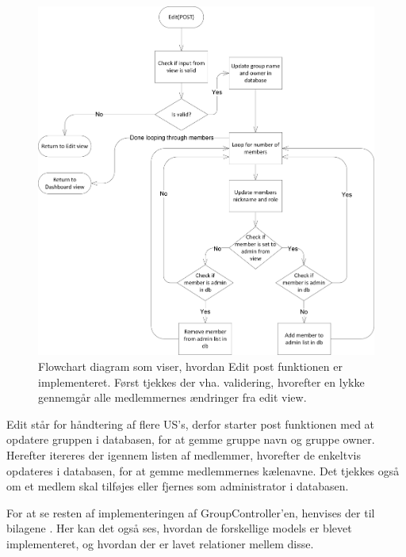 \begin{figure}[H]
  \includegraphics[width=\linewidth]{01_Billeder/10_Design_og_implementering/Group/Imp_Group_Edit_Post2.png}
  \centering
  \caption{Flowchart diagram som viser, hvordan Edit post funktionen er implementeret. Først tjekkes der vha. validering, hvorefter en lykke gennemgår alle medlemmernes ændringer fra edit view.}
  \label{fig:group_edit_post_imp}
\end{figure}

Edit står for håndtering af flere US’s, derfor starter post funktionen med at opdatere gruppen i databasen, for at gemme gruppe navn og gruppe owner. Herefter itereres der igennem listen af medlemmer, hvorefter de enkeltvis opdateres i databasen, for at gemme medlemmernes kælenavne. Det tjekkes også om et medlem skal tilføjes eller fjernes som administrator i databasen.

For at se resten af implementeringen af GroupController'en, henvises der til bilagene . Her kan det også ses, hvordan de forskellige models er blevet implementeret, og hvordan der er lavet relationer mellem disse.





